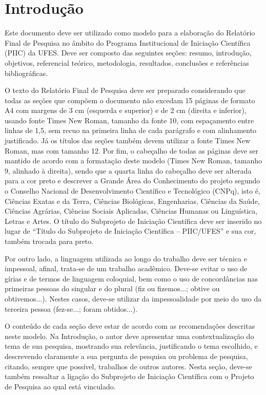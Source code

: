 \documentclass[10pt, a4paper]{article}
\begin{document}
  
\section{Introdução}
\label{sec-intro}

Este documento deve ser utilizado como modelo para a elaboração do Relatório Final de Pesquisa no âmbito do Programa Institucional de Iniciação Científica (PIIC) da UFES. Deve ser composto das seguintes seções: resumo, introdução, objetivos, referencial teórico, metodologia, resultados, conclusões e referências bibliográficas. 

O texto do Relatório Final de Pesquisa deve ser preparado considerando que todas as seções que compõem o documento não excedam 15 páginas de formato A4 com margens de 3 cm (esquerda e superior) e de 2 cm (direita e inferior), usando fonte Times New Roman, tamanho da fonte 10, com espaçamento entre linhas de 1,5, sem recuo na primeira linha de cada parágrafo e com alinhamento justificado. Já os títulos das seções também devem utilizar a fonte Times New Roman, mas com tamanho 12. Por fim, o cabeçalho de todas as páginas deve ser mantido de acordo com a formatação deste modelo (Times New Roman, tamanho 9, alinhado à direita), sendo que a quarta linha do cabeçalho deve ser alterada para a cor preto e descrever a Grande Área do Conhecimento do projeto segundo o Conselho Nacional de Desenvolvimento Científico e Tecnológico (CNPq), isto é, Ciências Exatas e da Terra, Ciências Biológicas, Engenharias, Ciências da Saúde, Ciências Agrárias, Ciências Sociais Aplicadas, Ciências Humanas ou Linguística, Letras e Artes. O título do Subprojeto de Iniciação Científica deve ser inserido no lugar de ``Título do Subprojeto de Iniciação Científica – PIIC/UFES'' e sua cor, também trocada para preto.

Por outro lado, a linguagem utilizada ao longo do trabalho deve ser técnica e impessoal, afinal, trata-se de um trabalho acadêmico. Deve-se evitar o uso de gírias e de termos de linguagem coloquial, bem como o uso de concordâncias nas primeiras pessoas do singular e do plural (fiz ou fizemos...; obtive ou obtivemos...). Nestes casos, deve-se utilizar da impessoalidade por meio do uso da terceira pessoa (fez-se...; foram obtidos...). 

O conteúdo de cada seção deve estar de acordo com as recomendações descritas neste modelo. Na Introdução, o autor deve apresentar uma contextualização do tema de sua pesquisa, mostrando sua relevância, justificando o tema escolhido, e descrevendo claramente a sua pergunta de pesquisa ou problema de pesquisa, citando, sempre que possível, trabalhos de outros autores. Nesta seção, deve-se também ressaltar a ligação do Subprojeto de Iniciação Científica com o Projeto de Pesquisa ao qual está vinculado.
\end{document}
